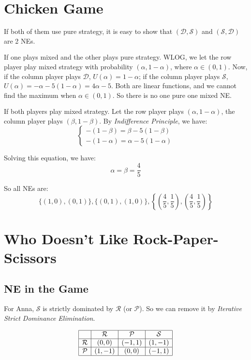 \documentclass{article}
\begin{document}
    \section{Chicken Game}

    If both of them use pure strategy, it is easy to show that $(\mathcal{D}, \mathcal{S})$ and $(\mathcal{S}, \mathcal{D})$ are 2 NEs.

    If one plays mixed and the other plays pure strategy. WLOG, we let the row player play mixed strategy with probability $(\alpha, 1-\alpha)$, where $\alpha\in(0, 1)$. Now, if the column player plays $\mathcal{D}$, $U(\alpha)=1-\alpha$; if the column player plays $\mathcal{S}$, $U(\alpha)=-\alpha-5(1-\alpha)=4\alpha-5$. Both are linear functions, and we cannot find the maximum when $\alpha\in(0, 1)$. So there is no one pure one mixed NE.

    If both players play mixed strategy. Let the row player plays $(\alpha, 1-\alpha)$, the column player plays $(\beta, 1-\beta)$. By \textit{Indifference Principle}, we have:
    $$
    \begin{cases}
        -(1-\beta)=\beta-5(1-\beta)\\
        -(1-\alpha)=\alpha-5(1-\alpha)
    \end{cases}
    $$

    Solving this equation, we have:
    $$
    \alpha=\beta=\frac{4}{5}
    $$

    So all NEs are:
    $$
    \{(1, 0), (0, 1)\}, \{(0, 1), (1, 0)\}, \left\{\left(\frac{4}{5}, \frac{1}{5}\right),\left(\frac{4}{5}, \frac{1}{5}\right)\right\}
    $$

    \section{Who Doesn't Like Rock-Paper-Scissors}

    \subsection{NE in the Game}

    For Anna, $\mathcal{S}$ is strictly dominated by $\mathcal{R}$ (or $\mathcal{P}$). So we can remove it by \textit{Iterative Strict Dominance Elimination}.

    \[
    \begin{array}{|c|c|c|c|}
    \hline
     & \mathcal{R} & \mathcal{P} & \mathcal{S} \\ \hline
    \mathcal{R} & (0,0) & (-1,1) & (1,-1) \\ \hline
    \mathcal{P} & (1,-1) & (0,0) & (-1,1) \\ \hline
    \end{array}
    \]
\end{document}
